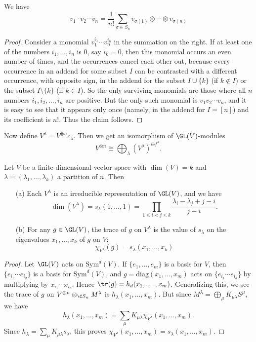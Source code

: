 \begin{lemma}
We have
\[v_1\cdot v_2\cdots v_n=\frac{1}{n!}\sum_{\sigma\in S_n}v_{\sigma(1)}\otimes\cdots\otimes v_{\sigma(n)}\]
\end{lemma}
\begin{proof}
Consider a monomial $v_1^{i_1}\cdots v_n^{i_n}$ in the summation on the right. If at least one of the numbers $i_1,\dots,i_n$ is $0$, say $i_k=0$, then this monomial occurs an even number of times, and the occurrences cancel each other out, because every occurrence in an addend for some subset $I$ can be contrasted with a different occurrence, with opposite sign, in the addend for the subset $I\cup\{k\}$ (if $k\notin I$) or the subset $I\setminus\{k\}$ (if $k\in I$). So the only surviving monomials are those where all $n$ numbers $i_1,i_2,\dots,i_n$ are positive. But the only such monomial is $v_1v_2\cdots v_n$, and it is easy to see that it appears only once (namely, in the addend for $I=[n]$) and its coefficient is $n!$. Thus the claim follows.
\end{proof}
Now define $V^\lambda=V^{\otimes n}c_\lambda$. Then we get an isomorphism of $\GL(V)$-modules
\[V^{\otimes n}\cong\bigoplus_\lambda (V^\lambda)^{\oplus f^\lambda}.\]
\begin{theorem}
Let $V$ be a finite dimensional vector space with $\dim(V)=k$ and $\lambda=(\lambda_1,\dots,\lambda_k)$ a partition of $n$. Then
\begin{itemize}
\item[(a)] Each $V^\lambda$ is an irreducible representation of $\GL(V)$, and we have
\[\dim(V^\lambda)=s_\lambda(1,\dots,1)=\prod_{1\leq i<j\leq k}\frac{\lambda_i-\lambda_j+j-i}{j-i}.\] 
\item[(b)] For any $g\in\GL(V)$, the trace of $g$ on $V^\lambda$ is the value of $s_\lambda$ on the eigenvalues $x_1,\dots,x_k$ of $g$ on $V$:
\[\chi_{V^\lambda}(g)=s_\lambda(x_1,\dots,x_k)\] 
\end{itemize}
\end{theorem}
\begin{proof}
Let $\GL(V)$ acts on $\mathrm{Sym}^{d}(V)$. If $\{e_1,\dots,e_m\}$ is a basis for $V$, then $\{e_{i_1}\cdots e_{i_d}\}$ is a basis for $\mathrm{Sym}^d(V)$, and $g=\mathrm{diag}(x_1,\dots,x_m)$ acts on $\{e_{i_1}\cdots e_{i_d}\}$ by multiplying by $x_{i_1}\cdots x_{i_d}$. Hence $\tr(g)=h_d(x_1,\dots,x_m)$. Generalizing this, we see the trace of $g$ on $V^{\otimes n}\otimes_{\C S_n}M^\lambda$ is $h_\lambda(x_1,\dots,x_m)$. But since $M^\lambda=\bigoplus_\mu K_{\mu\lambda}S^\mu$, we have
\[h_\lambda(x_1,\dots,x_m)=\sum_\mu K_{\mu\lambda}\chi_{V^\lambda}(x_1,\dots,x_m).\]
Since $h_\lambda=\sum_\mu K_{\mu\lambda}s_\lambda$, this proves $\chi_{V^\lambda}(x_1,\dots,x_m)=s_\lambda(x_1,\dots,x_m)$.
\end{proof}
